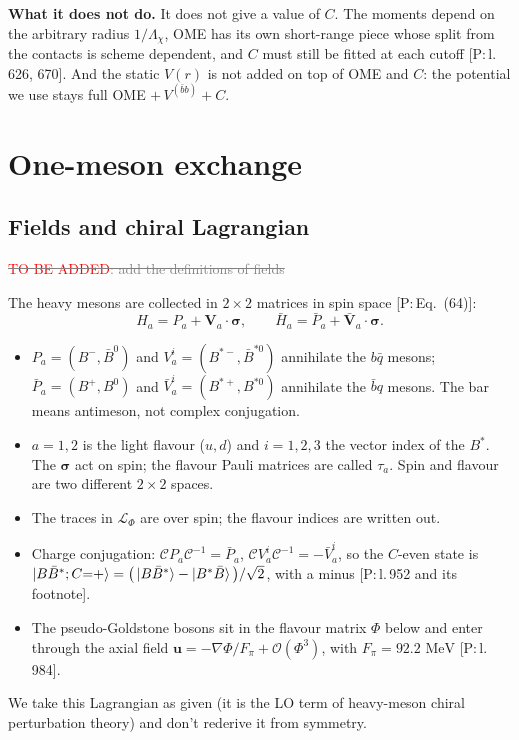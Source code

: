 \documentclass[11pt,a4paper]{article}
\newcommand{\tagP}[1]{\textcolor{blue!65!black}{\textsf{\small[P:\,#1]}}}
\renewcommand{\VQQ}{V^{(\bar bb)}}
\renewcommand{\MeV}{\,\mathrm{MeV}}
\newcommand{\todo}{\textcolor{red}{TO BE ADDED}}
\newcommand{\aifix}[2]{\textcolor{gray}{\sout{#1}} \textcolor{aicolor}{#2}}
\newcommand{\aifix}[2]{#2}
\newenvironment{aiadd}{\par}{\par}
\begin{document}
\begin{aiadd}
	\textbf{What it does not do.} It does not give a value of $C$. The moments depend on the arbitrary radius $1/\Lambda_\chi$, OME has its own short-range piece whose split from the contacts is scheme dependent, and $C$ must still be fitted at each cutoff \tagP{l.\,626, 670}. And the static $V(r)$ is not added on top of OME and $C$: the potential we use stays full OME $+\,\VQQ+C$.
\end{aiadd}

\section{One-meson exchange}
\subsection{Fields and chiral Lagrangian}

\aifix{\todo: add the definitions of fields}{}

\begin{aiadd}
	The heavy mesons are collected in $2\times2$ matrices in spin space \tagP{Eq.~(64)}:
	\[
		H_a=P_a+\bm V_a\cdot\bm\sigma,\qquad \bar H_a=\bar P_a+\bar{\bm V}_a\cdot\bm\sigma .
	\]
	\begin{itemize}
		\item $P_a=(B^-,\bar B^0)$ and $V^i_a=(B^{*-},\bar B^{*0})$ annihilate the $b\bar q$ mesons; $\bar P_a=(B^+,B^0)$ and $\bar V^i_a=(B^{*+},B^{*0})$ annihilate the $\bar bq$ mesons. The bar means antimeson, not complex conjugation.
		\item $a=1,2$ is the light flavour ($u,d$) and $i=1,2,3$ the vector index of the $B^*$. The $\bm\sigma$ act on spin; the flavour Pauli matrices are called $\tau_a$. Spin and flavour are two different $2\times2$ spaces.
		\item The traces in $\mathcal L_\Phi$ are over spin; the flavour indices are written out.
		\item Charge conjugation: $\mathcal CP_a\mathcal C^{-1}=\bar P_a$, $\mathcal CV^i_a\mathcal C^{-1}=-\bar V^i_a$, so the $C$-even state is $\ket{B\bar B^*;C{=}+}=\big(\ket{B\bar B^*}-\ket{B^*\bar B}\big)/\sqrt2$, with a minus \tagP{l.\,952 and its footnote}.
		\item The pseudo-Goldstone bosons sit in the flavour matrix $\Phi$ below and enter through the axial field $\bm u=-\nabla\Phi/F_\pi+\mathcal O(\Phi^3)$, with $F_\pi=92.2\,\MeV$ \tagP{l.\,984}.
	\end{itemize}
	We take this Lagrangian as given (it is the LO term of heavy-meson chiral perturbation theory) and don't rederive it from symmetry.
\end{aiadd}
\end{document}
